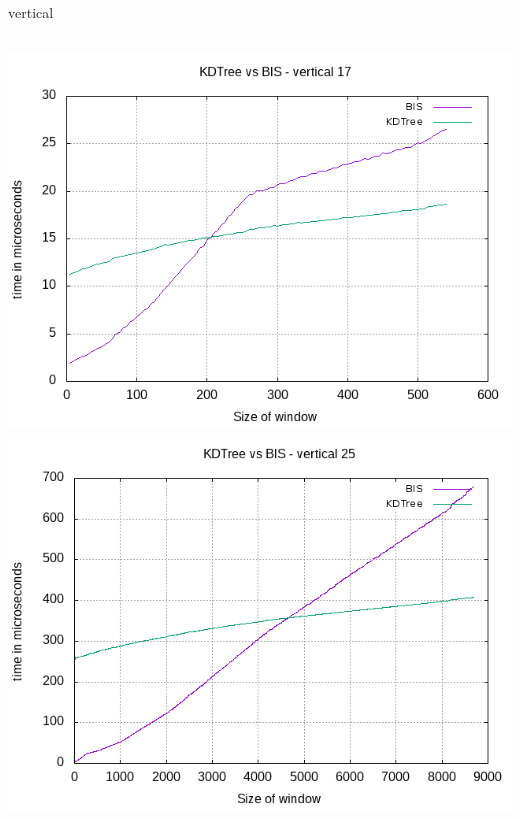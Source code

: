 \documentclass[pdf]{beamer}
\begin{document}
\begin{frame}{vertical}
  \begin{columns}
    \includegraphics[scale=0.32]{pictures/analysis/vert_17.png}
    \includegraphics[scale=0.32]{pictures/analysis/vert_25.png}
  \end{columns}
\end{frame}
\end{document}
